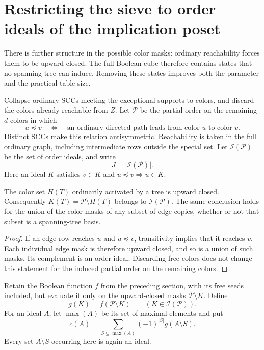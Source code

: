 \section{Restricting the sieve to order ideals of the implication poset}
\label{sec:ideal-sieve}

There is further structure in the possible color masks: ordinary
reachability forces them to be upward closed.  The full Boolean cube
therefore contains states that no spanning tree can induce.  Removing
these states improves both the parameter and the practical table size.

Collapse ordinary SCCs meeting the exceptional supports to colors, and
discard the colors already reachable from $Z$.  Let $\mathcal P$ be the
partial order on the remaining $d$ colors in which
\[
                  u\preceq v
           \quad\Longleftrightarrow\quad
       \text{an ordinary directed path leads from color $u$ to color $v$}.
\]
Distinct SCCs make this relation antisymmetric.  Reachability is taken in
the full ordinary graph, including intermediate rows outside the special
set.  Let $\mathcal I(\mathcal P)$ be the set of order ideals, and write
\[
                        J=|\mathcal I(\mathcal P)|.
\]
Here an ideal $K$ satisfies $v\in K$ and $u\preceq v\Rightarrow u\in K$.

\begin{lemma}\label{lem:missed-ideal}
The color set $H(T)$ ordinarily activated by a tree is upward closed.
Consequently $K(T)=\mathcal P\setminus H(T)$ belongs to
$\mathcal I(\mathcal P)$.  The same conclusion holds for the union of the
color masks of any subset of edge copies, whether or not that subset is
a spanning-tree basis.
\end{lemma}
\begin{proof}
If an edge row reaches $u$ and $u\preceq v$, transitivity implies that
it reaches $v$.  Each individual edge mask is therefore upward closed,
and so is a union of such masks.  Its complement is an order ideal.
Discarding free colors does not change this statement for the induced
partial order on the remaining colors.
\end{proof}

Retain the Boolean function $f$ from the preceding section, with its
free seeds included, but evaluate it only on the upward-closed masks
$\mathcal P\setminus K$.  Define
\[
                    g(K)=f(\mathcal P\setminus K)
                         \qquad(K\in\mathcal I(\mathcal P)).
\]
For an ideal $A$, let $\max(A)$ be its set of maximal elements and put
\begin{equation}\label{eq:ideal-coefficients}
                 c(A)=\sum_{S\subseteq\max(A)}
                             (-1)^{|S|}g(A\setminus S).
\end{equation}
Every set $A\setminus S$ occurring here is again an ideal.

